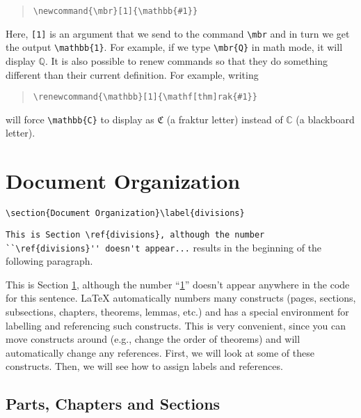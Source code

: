 \documentclass[letterpaper,twoside,10pt]{article}
\begin{document}
\begin{quote}
 \verb!\newcommand{\mbr}[1]{\mathbb{#1}}!
\end{quote}

\newcommand{\mbr}[1]{\mathbb{#1}}

Here, \texttt{[1]} is an argument that we send to the command \verb!\mbr! and in turn we get the output \verb!\mathbb{1}!. For example, if we type \verb!\mbr{Q}! in math mode, it will display $\mbr{Q}$. It is also possible to renew commands so that they do something different than their current definition. For example, writing

\begin{quote}
 \verb!\renewcommand{\mathbb}[1]{\mathf[thm]rak{#1}}!
\end{quote}

will force \verb!\mathbb{C}! to display as $\mathfrak{C}$ (a fraktur letter) instead of $\mathbb{C}$ (a blackboard letter).



\section{Document Organization}\label{divisions}

{\small\verb!\section{Document Organization}\label{divisions}!}

\medbreak
{\small\verb!This is Section \ref{divisions}, although the number ``\ref{divisions}'' doesn't appear...!} results in the beginning of the following paragraph.

\bigbreak This is Section \ref{divisions}, although the number ``\ref{divisions}'' doesn't appear anywhere in the code for this sentence. {\LaTeX} automatically numbers many constructs (pages, sections, subsections, chapters, theorems, lemmas, etc.) and has a special environment for labelling and referencing such constructs. This is very convenient, since you can move constructs around (e.g., change the order of theorems) and {\LaTeXe} will automatically change any references. First, we will look at some of these constructs. Then, we will see how to assign labels and references.

\subsection[Parts, Chapters \& Sections]{Parts, Chapters and Sections}\label{parts}
\end{document}
